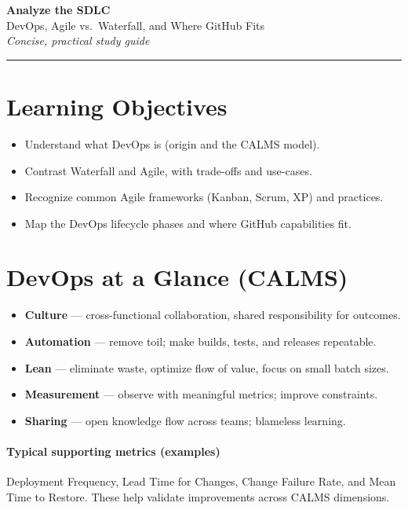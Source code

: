 \documentclass[11pt]{article}
\providecommand{\term}[1]{\textbf{#1}}
\newcommand{\gh}{GitHub}
\begin{document}
\begin{center}
{\LARGE\bfseries Analyze the SDLC}\\[4pt]
{\large DevOps, Agile vs.\ Waterfall, and Where \gh{} Fits}\\[6pt]
\textit{Concise, practical study guide}
\end{center}
\vspace{0.5em}
\hrule
\vspace{1em}

\section*{Learning Objectives}
\begin{itemize}
  \item Understand what DevOps is (origin and the CALMS model).
  \item Contrast Waterfall and Agile, with trade-offs and use-cases.
  \item Recognize common Agile frameworks (Kanban, Scrum, XP) and practices.
  \item Map the DevOps lifecycle phases and where \gh{} capabilities fit.
\end{itemize}

\section{DevOps at a Glance (CALMS)}
\begin{keybox}
\begin{itemize}
  \item \term{Culture} — cross-functional collaboration, shared responsibility for outcomes.
  \item \term{Automation} — remove toil; make builds, tests, and releases repeatable.
  \item \term{Lean} — eliminate waste, optimize flow of value, focus on small batch sizes.
  \item \term{Measurement} — observe with meaningful metrics; improve constraints.
  \item \term{Sharing} — open knowledge flow across teams; blameless learning.
\end{itemize}
\end{keybox}

\paragraph{Typical supporting metrics (examples)} Deployment Frequency, Lead Time for Changes, Change Failure Rate, and Mean Time to Restore. These help validate improvements across CALMS dimensions.
\end{document}
